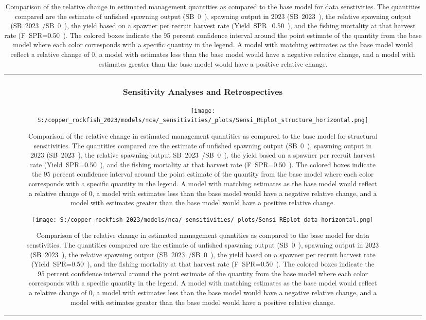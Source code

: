 \documentclass[11pt,
  letterpaper,
]{article}
\begin{document}
\begin{longtable}[t]{c>{\centering\arraybackslash}p{2cm}>{\centering\arraybackslash}p{2cm}>{\centering\arraybackslash}p{2cm}}
\clearpage

\subsubsection{Sensitivity Analyses and Retrospectives}\label{sensitivity-analyses-and-retrospectives}

\begin{figure}
{\centering
\texttt{[image: S:/copper\_rockfish\_2023/models/nca/\_sensitivities/\_plots/Sensi\_REplot\_structure\_horizontal.png]}
}
\caption{Comparison of the relative change in estimated management quantities as compared to the 
base model for structural sensitivities. The quantities compared are the estimate of unfished 
spawning output (SB~0~), spawning output in 2023 (SB~2023~), the relative spawning output 
SB~2023~/SB~0~), the yield based on a spawner per recruit harvest rate (Yield~SPR=0.50~),
and the fishing mortality at that harvest rate (F~SPR=0.50~). The colored boxes indicate the 95 percent confidence interval around the point estimate of the quantity from the base model where each color corresponds with a specific quantity in the legend. A model with matching estimates as the base model would reflect a relative change of 0, a model with estimates less than the base model would have a negative relative change, and a model with estimates greater than the base model would have a positive relative change.\label{fig:sens-structure}}
\end{figure}

\newpage

\begin{figure}
{\centering
\texttt{[image: S:/copper\_rockfish\_2023/models/nca/\_sensitivities/\_plots/Sensi\_REplot\_data\_horizontal.png]}
}
\caption{Comparison of the relative change in estimated management quantities as compared to the 
base model for data senstivities. The quantities compared are the estimate of unfished spawning 
output (SB~0~), spawning output in 2023 (SB~2023~), the relative spawning output (SB~2023~/SB~0~), 
the yield based on a spawner per recruit harvest rate (Yield~SPR=0.50~), and the fishing mortality at that harvest rate (F~SPR=0.50~). The colored boxes indicate the 95 percent confidence interval around the point estimate of the quantity from the base model where each color corresponds with a specific quantity in the legend. A model with matching estimates as the base model would reflect a relative change of 0, a model with estimates less than the base model would have a negative relative change, and a model with estimates greater than the base model would have a positive relative change.\label{fig:sens-data}}
\end{figure}


\end{longtable}
\end{document}
